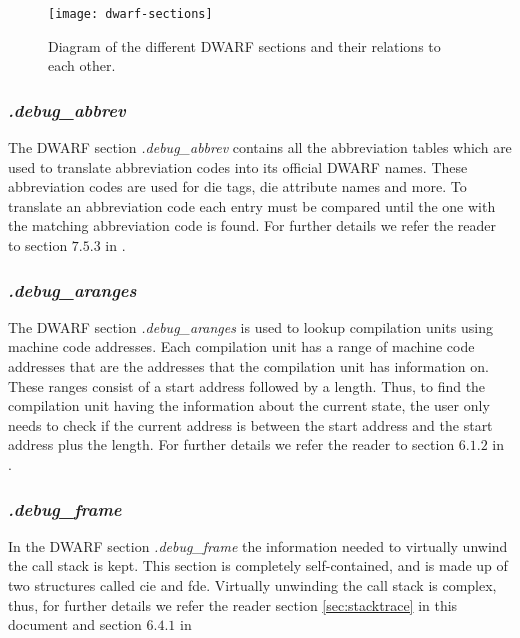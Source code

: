 \begin{figure}[h]
	\centering
	\texttt{[image: dwarf-sections]}
	\caption{Diagram of the different \gls{DWARF} sections and their relations to each other.}
	\label{fig:dwarfsections}
\end{figure}


\subsubsection{\emph{.debug\_abbrev}}
The \gls{DWARF} section \emph{.debug\_abbrev} contains all the abbreviation tables which are used to translate abbreviation codes into its official \gls{DWARF} names.
These abbreviation codes are used for \acrfull{die} tags, \gls{die} attribute names and more.
To translate an abbreviation code each entry must be compared until the one with the matching abbreviation code is found.
For further details we refer the reader to section $7.5.3$ in \cite{dwarf}.


\subsubsection{\emph{.debug\_aranges}}
The \gls{DWARF} section \emph{.debug\_aranges} is used to lookup compilation units using machine code addresses.
Each compilation unit has a range of machine code addresses that are the addresses that the compilation unit has information on.
These ranges consist of a start address followed by a length.
Thus, to find the compilation unit having the information about the current state, the user only needs to check if the current address is between the start address and the start address plus the length.
For further details we refer the reader to section $6.1.2$ in \cite{dwarf}.


\subsubsection{\emph{.debug\_frame}}
In the \gls{DWARF} section \emph{.debug\_frame} the information needed to virtually unwind the call stack is kept.
This section is completely self-contained, and is made up of two structures called \acrfull{cie} and \acrfull{fde}.
Virtually unwinding the call stack is complex, thus, for further details we refer the reader section \ref{sec:stacktrace} in this document and section $6.4.1$ in \cite{dwarf}


